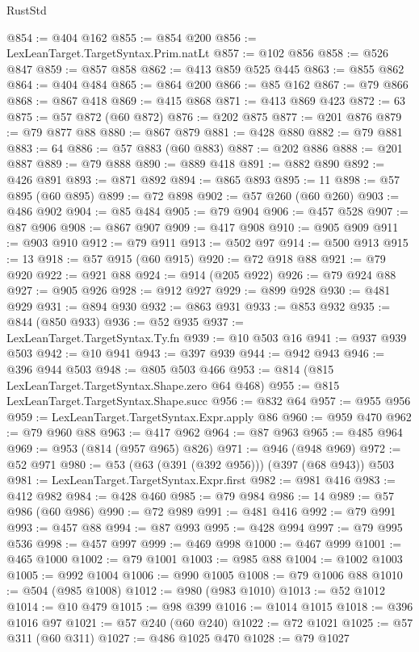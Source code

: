 \begin{lexlean}{RustStd}
\begin{coremodule}
@854 := @404 @162
@855 := @854 @200
@856 := LexLeanTarget.TargetSyntax.Prim.natLt
@857 := @102 @856
@858 := @526 @847
@859 := @857 @858
@862 := @413 @859 @525 @445
@863 := @855 @862
@864 := @404 @484
@865 := @864 @200
@866 := @85 @162
@867 := @79 @866
@868 := @867 @418
@869 := @415 @868
@871 := @413 @869 @423
@872 := 63
@875 := @57 @872 (@60 @872)
@876 := @202 @875
@877 := @201 @876
@879 := @79 @877 @88
@880 := @867 @879
@881 := @428 @880
@882 := @79 @881
@883 := 64
@886 := @57 @883 (@60 @883)
@887 := @202 @886
@888 := @201 @887
@889 := @79 @888
@890 := @889 @418
@891 := @882 @890
@892 := @426 @891
@893 := @871 @892
@894 := @865 @893
@895 := 11
@898 := @57 @895 (@60 @895)
@899 := @72 @898
@902 := @57 @260 (@60 @260)
@903 := @486 @902
@904 := @85 @484
@905 := @79 @904
@906 := @457 @528
@907 := @87 @906
@908 := @867 @907
@909 := @417 @908
@910 := @905 @909
@911 := @903 @910
@912 := @79 @911
@913 := @502 @97
@914 := @500 @913
@915 := 13
@918 := @57 @915 (@60 @915)
@920 := @72 @918 @88
@921 := @79 @920
@922 := @921 @88
@924 := @914 (@205 @922)
@926 := @79 @924 @88
@927 := @905 @926
@928 := @912 @927
@929 := @899 @928
@930 := @481 @929
@931 := @894 @930
@932 := @863 @931
@933 := @853 @932
@935 := @844 (@850 @933)
@936 := @52 @935
@937 := LexLeanTarget.TargetSyntax.Ty.fn
@939 := @10 @503 @16
@941 := @937 @939 @503
@942 := @10 @941
@943 := @397 @939
@944 := @942 @943
@946 := @396 @944 @503
@948 := @805 @503 @466
@953 := @814 (@815 LexLeanTarget.TargetSyntax.Shape.zero @64 @468)
@955 := @815 LexLeanTarget.TargetSyntax.Shape.succ
@956 := @832 @64
@957 := @955 @956
@959 := LexLeanTarget.TargetSyntax.Expr.apply @86
@960 := @959 @470
@962 := @79 @960 @88
@963 := @417 @962
@964 := @87 @963
@965 := @485 @964
@969 := @953 (@814 (@957 @965) @826)
@971 := @946 (@948 @969)
@972 := @52 @971
@980 := @53 (@63 (@391 (@392 @956))) (@397 (@68 @943)) @503
@981 := LexLeanTarget.TargetSyntax.Expr.first
@982 := @981 @416
@983 := @412 @982
@984 := @428 @460
@985 := @79 @984
@986 := 14
@989 := @57 @986 (@60 @986)
@990 := @72 @989
@991 := @481 @416
@992 := @79 @991
@993 := @457 @88
@994 := @87 @993
@995 := @428 @994
@997 := @79 @995 @536
@998 := @457 @997
@999 := @469 @998
@1000 := @467 @999
@1001 := @465 @1000
@1002 := @79 @1001
@1003 := @985 @88
@1004 := @1002 @1003
@1005 := @992 @1004
@1006 := @990 @1005
@1008 := @79 @1006 @88
@1010 := @504 (@985 @1008)
@1012 := @980 (@983 @1010)
@1013 := @52 @1012
@1014 := @10 @479
@1015 := @98 @399
@1016 := @1014 @1015
@1018 := @396 @1016 @97
@1021 := @57 @240 (@60 @240)
@1022 := @72 @1021
@1025 := @57 @311 (@60 @311)
@1027 := @486 @1025 @470
@1028 := @79 @1027

\end{coremodule}
\end{lexlean}
